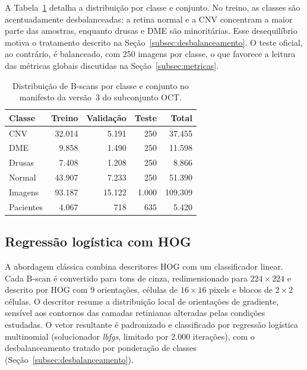 \documentclass[conference]{IEEEtran}
\begin{document}
A Tabela~\ref{tab:dataset} detalha a distribuição por classe e conjunto. No treino, as classes são acentuadamente desbalanceadas: a retina normal e a CNV concentram a maior parte das amostras, enquanto drusas e DME são minoritárias. Esse desequilíbrio motiva o tratamento descrito na Seção~\ref{subsec:desbalanceamento}. O teste oficial, ao contrário, é balanceado, com 250 imagens por classe, o que favorece a leitura das métricas globais discutidas na Seção~\ref{subsec:metricas}.

\begin{table}[t]
\caption{Distribuição de B-scans por classe e conjunto no manifesto da versão~3 do subconjunto OCT.}
\label{tab:dataset}
\centering
\footnotesize
\setlength{\tabcolsep}{5pt}
\renewcommand{\arraystretch}{1.15}
\begin{tabular}{l r r r r}
\toprule
\textbf{Classe} & \textbf{Treino} & \textbf{Validação} & \textbf{Teste} & \textbf{Total} \\
\midrule
CNV       & 32.014 &  5.191 &   250 & 37.455 \\
DME       &  9.858 &  1.490 &   250 & 11.598 \\
Drusas    &  7.408 &  1.208 &   250 &  8.866 \\
Normal    & 43.907 &  7.233 &   250 & 51.390 \\
\midrule
Imagens   & 93.187 & 15.122 & 1.000 & 109.309 \\
Pacientes &  4.067 &    718 &   635 &  5.420 \\
\bottomrule
\end{tabular}
\end{table}

\subsection{Regressão logística com HOG}
\label{subsec:hog_logreg}

A abordagem clássica combina descritores HOG com um classificador linear. Cada B-scan é convertido para tons de cinza, redimensionado para $224\times224$ e descrito por HOG com 9 orientações, células de $16\times16$ pixels e blocos de $2\times2$ células. O descritor resume a distribuição local de orientações de gradiente, sensível aos contornos das camadas retinianas alteradas pelas condições estudadas. O vetor resultante é padronizado e classificado por regressão logística multinomial (solucionador \textit{lbfgs}, limitado por 2.000 iterações), com o desbalanceamento tratado por ponderação de classes (Seção~\ref{subsec:desbalanceamento}).
\end{document}
